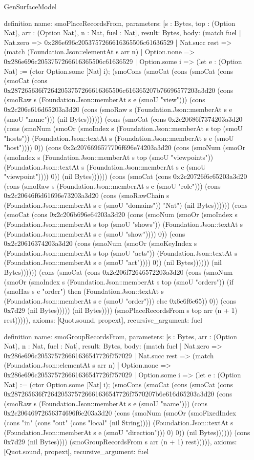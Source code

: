 \begin{lexlean}{GenSurfaceModel}
\begin{semanticmodule}
definition{
  name: smoPlaceRecordsFrom,
  parameters: [s : Bytes, top : (Option Nat), arr : (Option Nat), n : Nat, fuel : Nat],
  result: Bytes,
  body: (match fuel
    | Nat.zero => 0x286e696c2053757266616365506c61636529
    | Nat.succ rest => (match (Foundation.Json::elementAt s arr n)
      | Option.none => 0x286e696c2053757266616365506c61636529
      | Option.some i => (let e : (Option Nat) := (ctor Option.some [Nat] i); (smoCons (smoCat (cons (smoCat (cons (smoCat (cons 0x287265636f72642053757266616365506c616365207b76696577203a3d20 (cons (smoRaw s (Foundation.Json::memberAt s e (smoU "view"))) (cons 0x2c206e616d65203a3d20 (cons (smoRaw s (Foundation.Json::memberAt s e (smoU "name"))) (nil Bytes)))))) (cons (smoCat (cons 0x2c20686f7374203a3d20 (cons (smoNum (smoOr (smoIndex s (Foundation.Json::memberAt s top (smoU "hosts")) (Foundation.Json::textAt s (Foundation.Json::memberAt s e (smoU "host")))) 0)) (cons 0x2c2076696577706f696e74203a3d20 (cons (smoNum (smoOr (smoIndex s (Foundation.Json::memberAt s top (smoU "viewpoints")) (Foundation.Json::textAt s (Foundation.Json::memberAt s e (smoU "viewpoint")))) 0)) (nil Bytes)))))) (cons (smoCat (cons 0x2c20726f6c65203a3d20 (cons (smoRaw s (Foundation.Json::memberAt s e (smoU "role"))) (cons 0x2c20646f6d61696e73203a3d20 (cons (smoRawChain s (Foundation.Json::memberAt s e (smoU "domains")) "Nat") (nil Bytes)))))) (cons (smoCat (cons 0x2c206b696e64203a3d20 (cons (smoNum (smoOr (smoIndex s (Foundation.Json::memberAt s top (smoU "shows")) (Foundation.Json::textAt s (Foundation.Json::memberAt s e (smoU "show")))) 0)) (cons 0x2c20616374203a3d20 (cons (smoNum (smoOr (smoKeyIndex s (Foundation.Json::memberAt s top (smoU "acts")) (Foundation.Json::textAt s (Foundation.Json::memberAt s e (smoU "act")))) 0)) (nil Bytes)))))) (nil Bytes)))))) (cons (smoCat (cons 0x2c206f72646572203a3d20 (cons (smoNum (smoOr (smoIndex s (Foundation.Json::memberAt s top (smoU "orders")) (if (smoHas s e "order") then (Foundation.Json::textAt s (Foundation.Json::memberAt s e (smoU "order"))) else 0x6e6f6e65)) 0)) (cons 0x7d29 (nil Bytes))))) (nil Bytes)))) (smoPlaceRecordsFrom s top arr (n + 1) rest))))),
  axioms: [Quot.sound, propext],
  recursive_argument: fuel
}

definition{
  name: smoGroupRecordsFrom,
  parameters: [s : Bytes, arr : (Option Nat), n : Nat, fuel : Nat],
  result: Bytes,
  body: (match fuel
    | Nat.zero => 0x286e696c205375726661636547726f757029
    | Nat.succ rest => (match (Foundation.Json::elementAt s arr n)
      | Option.none => 0x286e696c205375726661636547726f757029
      | Option.some i => (let e : (Option Nat) := (ctor Option.some [Nat] i); (smoCons (smoCat (cons (smoCat (cons 0x287265636f7264205375726661636547726f7570207b6e616d65203a3d20 (cons (smoRaw s (Foundation.Json::memberAt s e (smoU "name"))) (cons 0x2c20646972656374696f6e203a3d20 (cons (smoNum (smoOr (smoFixedIndex (cons "in" (cons "out" (cons "local" (nil String)))) (Foundation.Json::textAt s (Foundation.Json::memberAt s e (smoU "direction"))) 0) 0)) (nil Bytes)))))) (cons 0x7d29 (nil Bytes)))) (smoGroupRecordsFrom s arr (n + 1) rest))))),
  axioms: [Quot.sound, propext],
  recursive_argument: fuel
}


\end{semanticmodule}
\end{lexlean}
